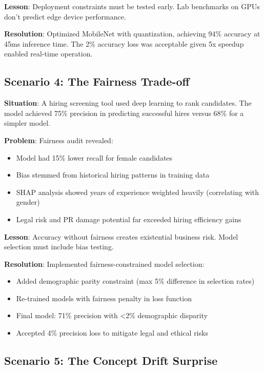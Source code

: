 \textbf{Lesson}: Deployment constraints must be tested early. Lab benchmarks on GPUs don't predict edge device performance.

\textbf{Resolution}: Optimized MobileNet with quantization, achieving 94\% accuracy at 45ms inference time. The 2\% accuracy loss was acceptable given 5x speedup enabled real-time operation.

\subsection{Scenario 4: The Fairness Trade-off}

\textbf{Situation}: A hiring screening tool used deep learning to rank candidates. The model achieved 75\% precision in predicting successful hires versus 68\% for a simpler model.

\textbf{Problem}: Fairness audit revealed:
\begin{itemize}
    \item Model had 15\% lower recall for female candidates
    \item Bias stemmed from historical hiring patterns in training data
    \item SHAP analysis showed years of experience weighted heavily (correlating with gender)
    \item Legal risk and PR damage potential far exceeded hiring efficiency gains
\end{itemize}

\textbf{Lesson}: Accuracy without fairness creates existential business risk. Model selection must include bias testing.

\textbf{Resolution}: Implemented fairness-constrained model selection:
\begin{itemize}
    \item Added demographic parity constraint (max 5\% difference in selection rates)
    \item Re-trained models with fairness penalty in loss function
    \item Final model: 71\% precision with <2\% demographic disparity
    \item Accepted 4\% precision loss to mitigate legal and ethical risks
\end{itemize}

\subsection{Scenario 5: The Concept Drift Surprise}

